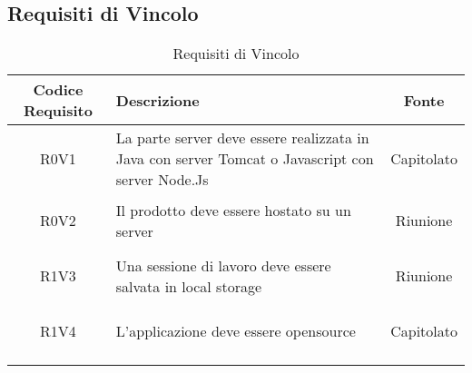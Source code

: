 \documentclass[../AnalisiDeiRequisiti.tex]{subfiles}
\begin{document}
\subsection{Requisiti di Vincolo}
\normalsize
\begin{longtable}{|c|>{\centering}p{7cm}|c|}
	\hline
	\textbf{Codice Requisito} & \textbf{Descrizione} & \textbf{Fonte}\\
	\hline
	\endhead
	\hypertarget{R0V1}{R0V1} & La parte server deve essere realizzata in Java con server Tomcat o Javascript con server Node.Js & Capitolato \\ \hline
	\hypertarget{R0V2}{R0V2} & Il prodotto deve essere hostato su un server & Riunione \\ \hline
	\hypertarget{R1V3}{R1V3} & Una sessione di lavoro deve essere salvata in local storage & Riunione \\ \hline
	\hypertarget{R1V4}{R1V4} & L'applicazione deve essere opensource
	& Capitolato \\ \hline
	\caption[Requisiti di Vincolo]{Requisiti di Vincolo}
	\label{tabella:req3}
\end{longtable}
\clearpage
\end{document}
